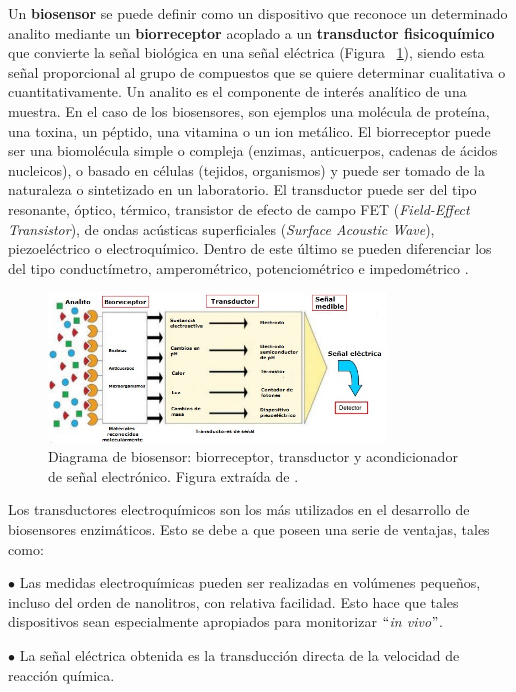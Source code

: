 Un \textbf{biosensor} se puede definir como un dispositivo que reconoce un determinado analito mediante un \textbf{biorreceptor} acoplado a un \textbf{transductor fisicoquímico} que convierte la señal biológica en una señal eléctrica (Figura ~\ref{fig:Figura_Biosensor}), siendo esta señal proporcional al grupo de compuestos que se quiere determinar cualitativa o cuantitativamente. Un analito es el componente de interés analítico de una muestra. En el caso de los biosensores, son ejemplos una molécula de proteína, una toxina, un péptido, una vitamina o un ion metálico. El biorreceptor puede ser una biomolécula simple o compleja (enzimas, anticuerpos, cadenas de ácidos nucleicos), o basado en células (tejidos, organismos) y puede ser tomado de la naturaleza o sintetizado en un laboratorio. El transductor puede ser del tipo resonante, óptico, térmico, transistor de efecto de campo FET (\textit{Field-Effect Transistor}), de ondas acústicas superficiales (\textit{Surface Acoustic Wave}), piezoeléctrico o electroquímico. Dentro de este último se pueden diferenciar los del tipo conductímetro, amperométrico, potenciométrico e impedométrico \cite{Eggins}.

\begin{figure}[H]
  \centering
    \includegraphics[width=0.8\textwidth]{Figuras/Figura_Biosensor}
  \caption{Diagrama de biosensor: biorreceptor, transductor y acondicionador de señal electrónico. Figura extraída de \cite{Lili1}.}
  \label{fig:Figura_Biosensor}
\end{figure}

Los transductores electroquímicos son los más utilizados en el desarrollo de biosensores enzimáticos. Esto se debe a que poseen una serie de ventajas, tales como:

$\bullet$ Las medidas electroquímicas pueden ser realizadas en volúmenes pequeños, incluso del orden de nanolitros, con relativa facilidad. Esto hace que tales dispositivos sean especialmente apropiados para monitorizar $``$\textit{in vivo}$"$.

$\bullet$ La señal eléctrica obtenida es la transducción directa de la velocidad de reacción química.


